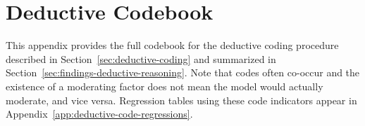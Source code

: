 \section{Deductive Codebook}
\label{app:deductive-codebook}

This appendix provides the full codebook for the deductive coding procedure described in Section~\ref{sec:deductive-coding} and summarized in Section~\ref{sec:findings-deductive-reasoning}. Note that codes often co-occur and the existence of a moderating factor does not mean the model would actually moderate, and vice versa. Regression tables using these code indicators appear in Appendix~\ref{app:deductive-code-regressions}.

\newcommand{\deductiveExample}[1]{%
\multicolumn{2}{p{0.94\textwidth}}{\textit{Example: #1}}\\[2pt]\\
}

